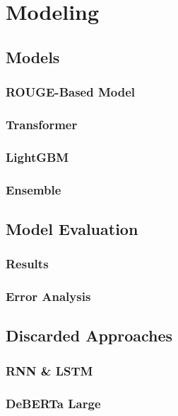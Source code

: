 \chapter{Modeling}


\section{Models}

\subsection{ROUGE-Based Model}

\pagebreak
\subsection{Transformer}


\pagebreak
\subsection{LightGBM}


\subsection{Ensemble}


\section{Model Evaluation}
\subsection{Results}


\pagebreak
\subsection{Error Analysis}



\section{Discarded Approaches}

\subsection{RNN \& LSTM}


\subsection{DeBERTa Large}
